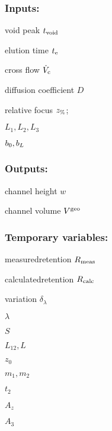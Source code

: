 \subsubsection*{Inputs:}
\begin{multicols}{3}
  \begin{packed_item}
    \item void peak $t_\text{void}$
    \item elution time $t_\text{e}$
    \item cross flow $\dot{V}_\text{c}$
    \item \small diffusion coefficient \normalsize $D$
    \item relative focus $z_\text{\%}$;
    \item $L_1, L_2, L_3$
    \item $b_0, b_L$
  \end{packed_item}
\end{multicols}

\subsubsection*{Outputs:}
\begin{multicols}{3}
  \begin{packed_item}
    \item channel height $w$ 
    \item channel volume $V^\text{geo}$    
  \end{packed_item}
\end{multicols}

\subsubsection*{Temporary variables:}
\begin{multicols}{3}
  \begin{packed_item}
    \item measured\enspace retention $R_\text{meas}$
    \item calculated\enspace retention $R_\text{calc}$
    \item variation $δ_λ$
    \item $λ$
    \item $S$
    \item $L_{12}, L$
    \item $z_0$
    \item $m_1, m_2$
    \item $t_2$
    \item $A_z$
    \item $A_3$
  \end{packed_item}
\end{multicols}

